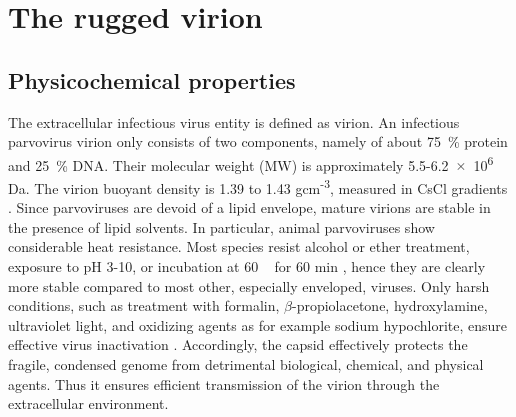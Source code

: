 
\chapter{The rugged virion} %

\label{Chapter4} %




\section{Physicochemical properties}
The extracellular infectious virus entity is defined as virion. An infectious parvovirus virion only consists of two components, namely of about 75~\% protein and 25~\% DNA. Their molecular weight (MW) is approximately 5.5-6.2~$\times$~10\textsuperscript{6} Da. The virion buoyant density is 1.39 to 1.43 gcm\textsuperscript{-3}, measured in CsCl gradients \cite{CsCl, pmid4317344}. Since parvoviruses are devoid of a lipid envelope, mature virions are stable in the presence of lipid solvents. In particular, animal parvoviruses show considerable heat resistance. Most species resist alcohol or ether treatment, exposure to pH 3-10, or incubation at 60 \textcelsius~ for 60 min \cite{pmid12935806, pmid12385412, pmid17880601, pmid19039515, pmid14660623, pmid10941577, pmid10662625}, hence they are clearly more stable compared to most other, especially enveloped, viruses. Only harsh conditions, such as treatment with formalin, $\beta$-propiolacetone, hydroxylamine, ultraviolet light, and oxidizing agents as for example sodium hypochlorite, ensure effective virus inactivation \cite{pmid4213983, pmid3416941, pmid7848502, pmid1520981}. Accordingly, the capsid effectively protects the fragile, condensed genome from detrimental biological, chemical, and physical agents. Thus it ensures efficient transmission of the virion through the extracellular environment.     

